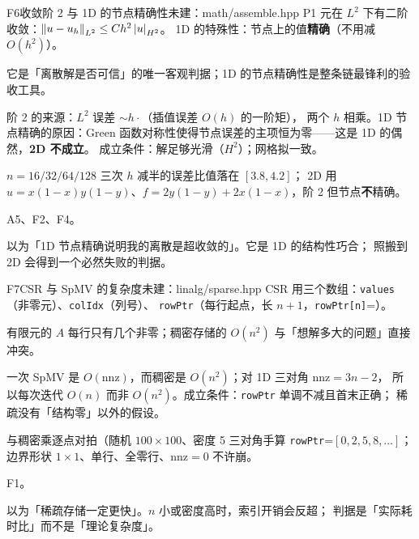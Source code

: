 \begin{know}{F6}{收敛阶 2 与 1D 的节点精确性}{未建：math/assemble.hpp}
 P1 元在 $L^{2}$ 下有二阶收敛：$\left\lVert u-u_h\right\rVert_{L^{2}}\le Ch^{2}\left\lvert u\right\rvert_{H^{2}}$。
1D 的特殊性：节点上的值\textbf{精确}（不用减 $O(h^{2})$）。

 它是「离散解是否可信」的唯一客观判据；1D 的节点精确性是整条链最锋利的验收工具。

 阶 2 的来源：$L^{2}$ 误差 $\sim h\cdot$（插值误差 $O(h)$ 的一阶矩），
两个 $h$ 相乘。1D 节点精确的原因：Green 函数对称性使得节点误差的主项恒为零——这是 1D 的偶然，\textbf{2D 不成立}。
成立条件：解足够光滑（$H^{2}$）；网格拟一致。

 $n=16/32/64/128$ 三次 $h$ 减半的误差比值落在 $[3.8,4.2]$；
2D 用 $u=x(1-x)y(1-y)$、$f=2y(1-y)+2x(1-x)$，阶 2 但节点\textbf{不}精确。

 A5、F2、F4。

 以为「1D 节点精确说明我的离散是超收敛的」。它是 1D 的结构性巧合；
照搬到 2D 会得到一个必然失败的判据。
\end{know}

\begin{know}{F7}{CSR 与 SpMV 的复杂度}{未建：linalg/sparse.hpp}
 CSR 用三个数组：\texttt{values}（非零元）、\texttt{colIdx}（列号）、
\texttt{rowPtr}（每行起点，长 $n+1$，\texttt{rowPtr[n]}=）。

 有限元的 $A$ 每行只有几个非零；稠密存储的 $O(n^{2})$ 与「想解多大的问题」直接冲突。

 一次 SpMV 是 $O(\text{nnz})$，而稠密是 $O(n^{2})$；对 1D 三对角 $\text{nnz}=3n-2$，
所以每次迭代 $O(n)$ 而非 $O(n^{2})$。成立条件：\texttt{rowPtr} 单调不减且首末正确；
稀疏没有「结构零」以外的假设。

 与稠密乘逐点对拍（随机 $100\times100$、密度 5%
三对角手算 \texttt{rowPtr}=$[0,2,5,8,\dots]$；边界形状 $1\times1$、单行、全零行、$\text{nnz}=0$ 不许崩。

 F1。

 以为「稀疏存储一定更快」。$n$ 小或密度高时，索引开销会反超；
判据是「实际耗时比」而不是「理论复杂度」。
\end{know}

